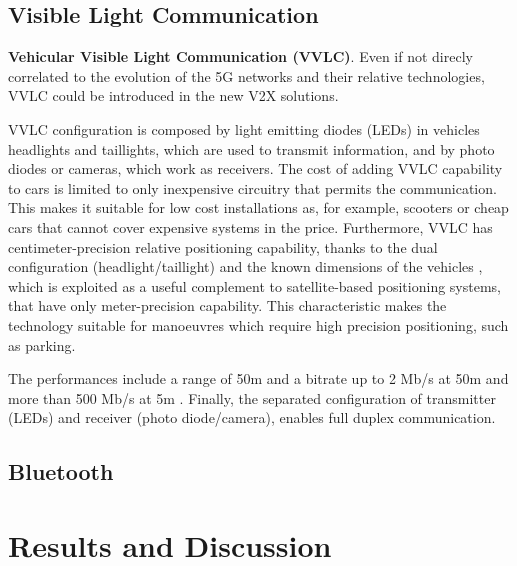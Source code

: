 \documentclass[conference,12pt,onecolumn]{IEEEtran}
\begin{document}
\subsection{Visible Light Communication}


\textbf{Vehicular Visible Light Communication (VVLC)}. Even if not direcly correlated to the evolution of the 5G networks and their relative technologies, VVLC could be introduced in the new V2X solutions.

 VVLC configuration is composed by light emitting diodes (LEDs) in vehicles headlights and taillights, which are used to transmit information, and by photo diodes or cameras, which work as receivers. The cost of adding VVLC capability to cars is limited to only inexpensive circuitry that permits the communication. This makes it suitable for low cost installations as, for example, scooters or cheap cars that cannot cover expensive systems in the price. Furthermore, VVLC has centimeter-precision relative positioning capability, thanks to the dual configuration (headlight/taillight) and the known dimensions of the vehicles \cite{roberts2010}, which is exploited as a useful complement to satellite-based positioning systems, that have only meter-precision capability. This characteristic makes the technology suitable for manoeuvres which require high precision positioning, such as parking.

The performances include a range of 50m and a bitrate up to 2 Mb/s at 50m and more than 500 Mb/s at 5m \cite{yu2013}. Finally, the separated configuration of transmitter (LEDs) and receiver (photo diode/camera), enables full duplex communication.
\subsection{Bluetooth}

\section{Results and Discussion}
\end{document}
